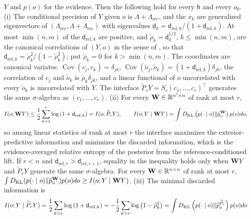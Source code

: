 \(Y\) and \(p(o)\) for the evidence. Then the following hold for every
\(\mathsf h\) and every \(o_0\).
(i) The conditional precision of \(Y\) given \(o\) is \(\Lambda+\Lambda_{\mathrm{rec}}\),
and the \(x_k\) are generalized eigenvectors of
\((\Lambda_{\mathrm{rec}},\Lambda+\Lambda_{\mathrm{rec}})\) with eigenvalues
\(\mathsf d_k=\mathsf d_{\mathrm{ref},k}/(1+\mathsf d_{\mathrm{ref},k})\). At most
\(\min(n,m)\) of the \(\mathsf d_{\mathrm{ref},k}\) are positive, and
\(\check\rho_k=\mathsf d_k^{1/2}\), \(k\leq\min(n,m)\), are the canonical
correlations of \((Y,o)\) in the sense of
, so that
\(\mathsf d_{\mathrm{ref},k}=\check\rho_k^2/(1-\check\rho_k^2)\); put
\(\check\rho_k=0\) for \(k>\min(n,m)\). The coordinates are canonical variates:
\(\operatorname{Cov}(c_j,c_k)=\delta_{jk}\),
\(\operatorname{Cov}(\tilde o_j,\tilde o_k)=(1+\mathsf d_{\mathrm{ref},k})\delta_{jk}\),
the correlation of \(c_j\) and \(\tilde o_k\) is \(\check\rho_k\delta_{jk}\), and a
linear functional of \(o\) uncorrelated with every \(\tilde o_k\) is uncorrelated
with \(Y\). The interface \(\widetilde P_rY=S_r(c_1,\ldots,c_r)^\top\) generates
the same \(\sigma\)-algebra as \((c_1,\ldots,c_r)\).
(ii) For every \(\mathbf W\in\mathbb R^{n'\times n}\) of rank at most \(r\),
\begin{equation}
I(o;\mathbf WY)\leq\frac12\sum_{k=1}^r\log\left(1+\mathsf d_{\mathrm{ref},k}\right)=I(o;\widetilde P_rY),
\qquad
I(o;Y\mid\mathbf WY)=\int D_{\mathrm{KL}}\left(p(\cdot\mid o)\Vert\bar p^{\mathbf W}_o\right)p(o)do,
\label{eq:cg-exterior-optimality}
\end{equation}
so among linear statistics of rank at most \(r\) the interface maximizes the
exterior-predictive information and minimizes the discarded information, which
is the evidence-averaged relative entropy of the posterior from the
reference-conditioned lift. If \(r<n\) and
\(\mathsf d_{\mathrm{ref},r}>\mathsf d_{\mathrm{ref},r+1}\), equality in the
inequality holds only when \(\mathbf WY\) and \(\widetilde P_rY\) generate the same
\(\sigma\)-algebra. For every \(\mathbf W\in\mathbb R^{n\times n}\) of rank at most \(r\),
\(\int D_{\mathrm{KL}}(p(\cdot\mid o)\Vert\widehat p^{\mathbf W}_o)p(o)do\geq I(o;Y\mid\mathbf WY)\).
(iii) The minimal discarded information is
\begin{equation}
I(o;Y\mid\widetilde P_rY)
=\frac12\sum_{k>r}\log\left(1+\mathsf d_{\mathrm{ref},k}\right)
=-\frac12\sum_{k>r}\log\left(1-\check\rho_k^2\right)
=\int D_{\mathrm{KL}}\left(p(\cdot\mid o)\Vert\widehat p^{\widetilde P_r}_o\right)p(o)do
\label{eq:cg-exterior-loss}
\end{equation}
